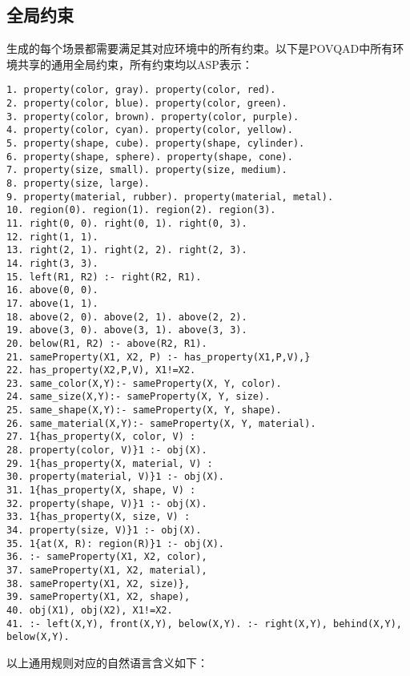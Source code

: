 \subsection{全局约束}
\label{appendix:environment}
生成的每个场景都需要满足其对应环境中的所有约束。以下是POVQAD中所有环境共享的通用全局约束，所有约束均以ASP表示：
\begin{lstlisting}
1. property(color, gray). property(color, red).
2. property(color, blue). property(color, green).
3. property(color, brown). property(color, purple).
4. property(color, cyan). property(color, yellow).
5. property(shape, cube). property(shape, cylinder).
6. property(shape, sphere). property(shape, cone).
7. property(size, small). property(size, medium).
8. property(size, large).
9. property(material, rubber). property(material, metal).
10. region(0). region(1). region(2). region(3).
11. right(0, 0). right(0, 1). right(0, 3).
12. right(1, 1). 
13. right(2, 1). right(2, 2). right(2, 3).
14. right(3, 3).
15. left(R1, R2) :- right(R2, R1).
16. above(0, 0).
17. above(1, 1).
18. above(2, 0). above(2, 1). above(2, 2).
19. above(3, 0). above(3, 1). above(3, 3).
20. below(R1, R2) :- above(R2, R1).
21. sameProperty(X1, X2, P) :- has_property(X1,P,V),}
22. has_property(X2,P,V), X1!=X2.
23. same_color(X,Y):- sameProperty(X, Y, color).
24. same_size(X,Y):- sameProperty(X, Y, size).
25. same_shape(X,Y):- sameProperty(X, Y, shape).
26. same_material(X,Y):- sameProperty(X, Y, material).
27. 1{has_property(X, color, V) :
28. property(color, V)}1 :- obj(X).
29. 1{has_property(X, material, V) :
30. property(material, V)}1 :- obj(X).
31. 1{has_property(X, shape, V) :
32. property(shape, V)}1 :- obj(X).
33. 1{has_property(X, size, V) :
34. property(size, V)}1 :- obj(X).
35. 1{at(X, R): region(R)}1 :- obj(X).
36. :- sameProperty(X1, X2, color),
37. sameProperty(X1, X2, material),
38. sameProperty(X1, X2, size)},
39. sameProperty(X1, X2, shape),
40. obj(X1), obj(X2), X1!=X2.
41. :- left(X,Y), front(X,Y), below(X,Y). :- right(X,Y), behind(X,Y), below(X,Y).
\end{lstlisting}
以上通用规则对应的自然语言含义如下：
